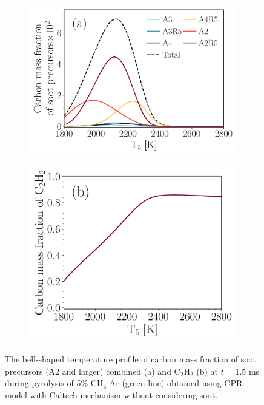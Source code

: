 \begin{figure}[H]
	\centering
	\begin{subfigure}[t]{0.4\textwidth}
		\includegraphics[width=1\textwidth]{Figures/Results/Shocktube/Agafonov2016_cpr/SPC_cmf_separate.pdf}
	\end{subfigure}
	\begin{subfigure}[t]{0.36\textwidth}
		\includegraphics[width=1\textwidth]{Figures/Results/Shocktube/Agafonov2016_cpr/C2H2_cmf.pdf}
	\end{subfigure}
	\caption{The bell-shaped temperature profile of carbon mass fraction of soot precursors (A2 and larger) combined (a) and $\mathrm{C_2H_2}$ (b) at $t=$1.5 ms during pyrolysis of 5\% $\mathrm{CH_4}$-Ar (green line) obtained using CPR model with Caltech mechanism without considering soot.}
	\label{fig:SPC_cmf_cpr} 
\end{figure}





